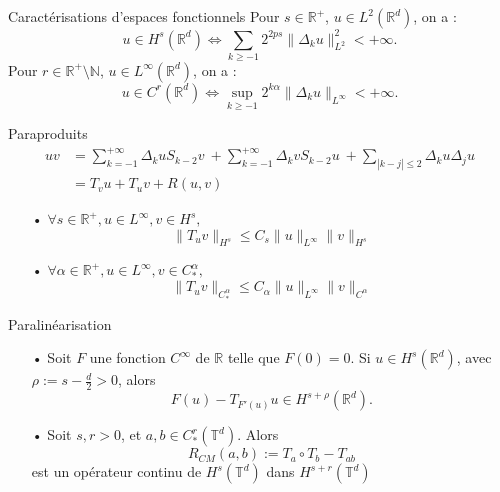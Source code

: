 \documentclass[10pt]{beamer}
\def\R{\mathbb R}
\def\T{\mathbb T}
\begin{document}
\begin{frame}{Caractérisations d'espaces fonctionnels}
 Pour $s\in \mathbb{R}^+$, $u\in L^2(\mathbb{R}^d)$, on a : \[ u\in H^s(\mathbb{R}^d) \Leftrightarrow \sum_{k\geq -1}2^{2ps}\|\Delta_k u \|_{L^2}^2 < +\infty. \] 
 Pour $r\in \mathbb{R}^+ \setminus \mathbb{N}$, $u\in L^\infty(\mathbb{R}^d)$, on a : \[ u\in C^r(\mathbb{R}^d) \Leftrightarrow \sup_{k \geq -1} 2^{k\alpha}\|\Delta_ku\|_{L^\infty} < +\infty . \] 
\end{frame}


\begin{frame}{Paraproduits}
\begin{align*}
uv &=\sum_{k=-1}^{+\infty}\Delta_kuS_{k-2}v  \ +  \sum_{k=-1}^{+\infty}\Delta_kvS_{k-2}u \ + \sum_{|k-j|\leq 2} \Delta_ku\Delta_ju \\
&= T_vu + T_uv + R(u,v)
\end{align*}

\begin{itemize}
\item[•] $\forall s\in \R^+, u \in L^\infty, v\in H^s,$
\[ \|T_uv\|_{H^s} \leq C_s \|u\|_{L^\infty} \|v\|_{H^s} \]
\item[•] $\forall \alpha \in \R^+, u \in L^\infty, v\in C^\alpha_*,$
\[\|T_uv\|_{C^\alpha_*} \leq C_\alpha \|u\|_{L^\infty} \|v\|_{C^\alpha}\]
\end{itemize}
\end{frame}

\begin{frame}{Paralinéarisation}
\begin{itemize}
\item[•]Soit $F$ une fonction $C^{\infty}$ de $\R$ telle que $F(0)=0$. Si $u\in H^s(\R^d)$, avec $\rho := s - \frac{d}{2}>0 $, alors 
\[F(u) - T_{F'(u)}u \in H^{s+\rho}(\R^d).\]
\item[•]
Soit $s,r>0$, et $a,b\in C^r_*(\T^d)$. Alors 
\[R_{CM}(a,b) := T_a \circ T_b - T_{ab} \]
est un opérateur continu de $H^s(\T^d)$ dans $H^{s+r}(\T^d)$
\end{itemize}
\end{frame}
\end{document}
